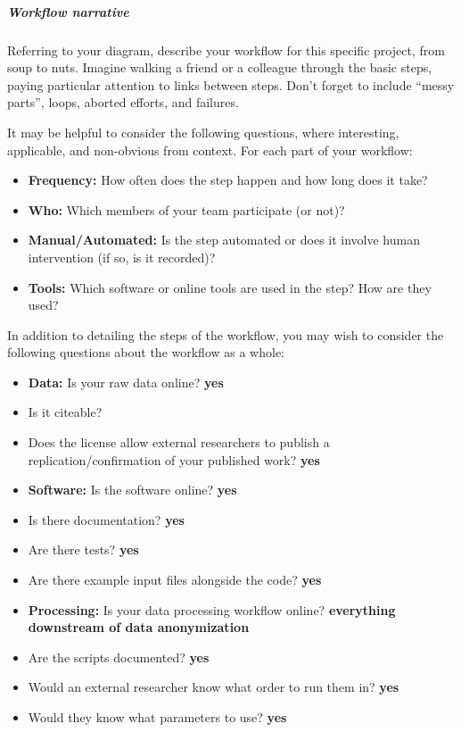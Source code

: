 \documentclass[]{article}
\begin{document}
\subparagraph{Workflow narrative}\label{workflow-narrative}

Referring to your diagram, describe your workflow for this specific
project, from soup to nuts. Imagine walking a friend or a colleague
through the basic steps, paying particular attention to links between
steps. Don't forget to include ``messy parts'', loops, aborted efforts,
and failures.

It may be helpful to consider the following questions, where
interesting, applicable, and non-obvious from context. For each part of
your workflow:

\begin{itemize}
\itemsep1pt\parskip0pt
\item
  \textbf{Frequency:} How often does the step happen and how long does
  it take?
\item
  \textbf{Who:} Which members of your team participate (or not)?
\item
  \textbf{Manual/Automated:} Is the step automated or does it involve
  human intervention (if so, is it recorded)?
\item
  \textbf{Tools:} Which software or online tools are used in the step?
  How are they used?
\end{itemize}

In addition to detailing the steps of the workflow, you may wish to
consider the following questions about the workflow as a whole:

\begin{itemize}
\itemsep1pt\parskip0pt
\item
  \textbf{Data:} Is your raw data online? \textbf{yes}
\item
  Is it citeable?
\item
  Does the license allow external researchers to publish a
  replication/confirmation of your published work? \textbf{yes}
\item
  \textbf{Software:} Is the software online? \textbf{yes}
\item
  Is there documentation? \textbf{yes}
\item
  Are there tests? \textbf{yes}
\item
  Are there example input files alongside the code? \textbf{yes}
\item
  \textbf{Processing:} Is your data processing workflow online?
  \textbf{everything downstream of data anonymization}
\item
  Are the scripts documented? \textbf{yes}
\item
  Would an external researcher know what order to run them in?
  \textbf{yes}
\item
  Would they know what parameters to use? \textbf{yes}
\end{itemize}
\end{document}
